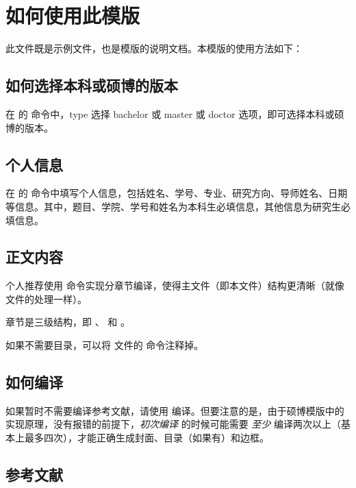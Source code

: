 
\section{如何使用此模版}

此文件既是示例文件，也是模版的说明文档。本模版的使用方法如下：

\subsection{如何选择本科或硕博的版本}

在  的  命令中，type 选择 bachelor 或 master 或 doctor 选项，即可选择本科或硕博的版本。


\subsection{个人信息}

在  的  命令中填写个人信息，包括姓名、学号、专业、研究方向、导师姓名、日期等信息。其中，题目、学院、学号和姓名为本科生必填信息，其他信息为研究生必填信息。


\subsection{正文内容}

个人推荐使用  命令实现分章节编译，使得主文件（即本文件）结构更清晰（就像  文件的处理一样）。

章节是三级结构，即 、 和 。

如果不需要目录，可以将  文件的  命令注释掉。


\subsection{如何编译}

如果暂时不需要编译参考文献，请使用  编译。但要注意的是，由于硕博模版中的实现原理，没有报错的前提下，\emph{初次编译} 的时候可能需要 \emph{至少} 编译两次以上（基本上最多四次），才能正确生成封面、目录（如果有）和边框。


\subsection{参考文献}

